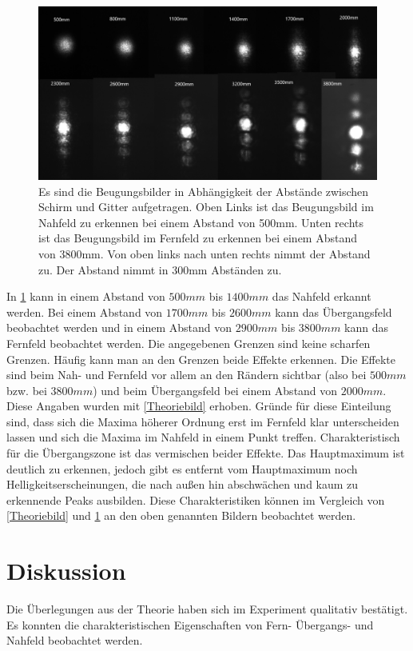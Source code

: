 \begin{figure}[h!]
	\centering
	\includegraphics[scale = 0.65]{alleabstande.png}
	\caption{Es sind die Beugungsbilder in Abhängigkeit der Abstände zwischen Schirm und Gitter aufgetragen. Oben Links ist das Beugungsbild im Nahfeld zu erkennen bei einem Abstand von 500mm. Unten rechts ist das Beugungsbild im Fernfeld zu erkennen bei einem Abstand von 3800mm. Von oben links nach unten rechts nimmt der Abstand zu. Der Abstand nimmt in 300mm Abständen zu.}
	\label{alle}
\end{figure}
In \cref{alle} kann in einem Abstand von $500 mm$ bis $1400 mm$ das Nahfeld erkannt werden. Bei einem Abstand von $1700 mm$ bis $2600 mm$  kann das Übergangsfeld beobachtet werden und in einem Abstand von $2900 mm$ bis $3800 mm$ kann das Fernfeld beobachtet werden. Die angegebenen Grenzen sind keine scharfen Grenzen. Häufig kann man an den Grenzen beide Effekte erkennen. Die Effekte sind beim Nah- und Fernfeld vor allem an den Rändern sichtbar (also bei $500 mm$ bzw. bei $3800 mm$) und beim Übergangsfeld bei einem Abstand von $2000 mm$. Diese Angaben wurden mit \cref{Theoriebild} erhoben. Gründe für diese Einteilung sind, dass sich die Maxima höherer Ordnung erst im Fernfeld klar unterscheiden lassen und sich die Maxima im Nahfeld in einem Punkt treffen. Charakteristisch für die Übergangszone ist das vermischen beider Effekte. Das Hauptmaximum ist deutlich zu erkennen, jedoch gibt es entfernt vom Hauptmaximum noch Helligkeitserscheinungen, die nach außen hin abschwächen und kaum zu erkennende Peaks ausbilden. Diese Charakteristiken können im Vergleich von \cref{Theoriebild} und \cref{alle} an den oben genannten Bildern beobachtet werden.

\section{Diskussion}
Die Überlegungen aus der Theorie haben sich im Experiment qualitativ bestätigt. Es konnten die charakteristischen Eigenschaften von Fern- Übergangs- und Nahfeld beobachtet werden.

